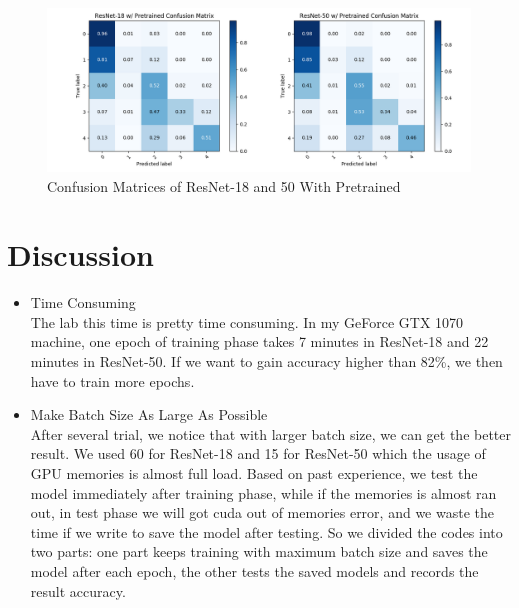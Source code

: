 \documentclass[12pt,a4paper]{article}
\begin{document}
\begin{itemize}
\begin{figure}[hbt]
\centering
  \includegraphics[scale=0.3]{confuse.png}
  \caption{Confusion Matrices of ResNet-18 and 50 With Pretrained}
  \label{fig:con}
\end{figure}
\end{itemize}


\section{Discussion} \label{sec:dis}
\begin{itemize}
\item{Time Consuming} \\
The lab this time is pretty time consuming. In my GeForce GTX 1070 machine, one epoch of training phase takes 7 minutes in ResNet-18 and 22 minutes in ResNet-50. If we want to gain accuracy higher than 82\%, we then have to train more epochs.
\item{Make Batch Size As Large As Possible} \\
After several trial, we notice that with larger batch size, we can get the better result. We used 60 for ResNet-18 and 15 for ResNet-50 which the usage of GPU memories is almost full load. Based on past experience, we test the model immediately after training phase, while if the memories is almost ran out, in test phase we will got cuda out of memories error, and we waste the time if we write to save the model after testing. So we divided the codes into two parts: one part keeps training with maximum batch size and saves the model after each epoch, the other tests the saved models and records the result accuracy.
\end{itemize}



\end{document}
